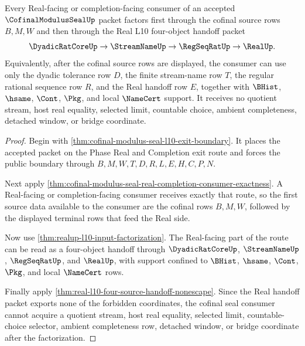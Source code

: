 \begin{theorem}
\label{thm:cofinal-modulus-seal-l10-four-object-factorization}
Every Real-facing or completion-facing consumer of an accepted $\CofinalModulusSealUp$ packet factors first through the cofinal source rows $B,M,W$ and then through the Real L10 four-object handoff packet
$$
\DyadicRatCoreUp \to \StreamNameUp \to \RegSeqRatUp \to \RealUp .
$$
Equivalently, after the cofinal source rows are displayed, the consumer can use only the dyadic tolerance row $D$, the finite stream-name row $T$, the regular rational sequence row $R$, and the Real handoff row $E$, together with $\BHist$, $\hsame$, $\Cont$, $\Pkg$, and local $\NameCert$ support. It receives no quotient stream, host real equality, selected limit, countable choice, ambient completeness, detached window, or bridge coordinate.
\end{theorem}
\begin{proof}
Begin with \autoref{thm:cofinal-modulus-seal-l10-exit-boundary}. It places the accepted packet on the Phase Real and Completion exit route and forces the public boundary through $B,M,W,T,D,R,L,E,H,C,P,N$.

Next apply \autoref{thm:cofinal-modulus-seal-real-completion-consumer-exactness}. A Real-facing or completion-facing consumer receives exactly that route, so the first source data available to the consumer are the cofinal rows $B,M,W$, followed by the displayed terminal rows that feed the Real side.

Now use \autoref{thm:realup-l10-input-factorization}. The Real-facing part of the route can be read as a four-object handoff through $\DyadicRatCoreUp$, $\StreamNameUp$, $\RegSeqRatUp$, and $\RealUp$, with support confined to $\BHist$, $\hsame$, $\Cont$, $\Pkg$, and local $\NameCert$ rows.

Finally apply \autoref{thm:real-l10-four-source-handoff-nonescape}. Since the Real handoff packet exports none of the forbidden coordinates, the cofinal seal consumer cannot acquire a quotient stream, host real equality, selected limit, countable-choice selector, ambient completeness row, detached window, or bridge coordinate after the factorization.
\end{proof}

